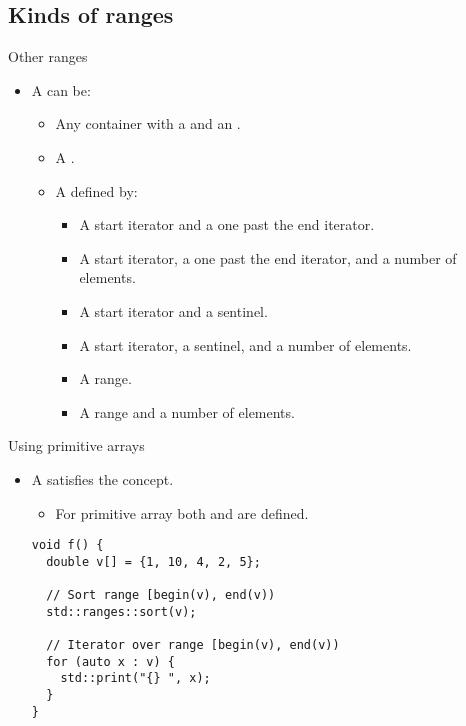 \subsection{Kinds of ranges}

\begin{frame}[t,fragile]{Other ranges}
\begin{itemize}
  \item A  can be:
    \begin{itemize}
      \item Any container with a  and an .
      \item A .
      \item A  defined by:
        \begin{itemize} 
          \item A start iterator and a one past the end iterator.
          \item A start iterator, a one past the end iterator, and a number of
                elements.
          \item A start iterator and a sentinel.
          \item A start iterator, a sentinel, and a number of elements.
          \item A range.
          \item A range and a number of elements.
        \end{itemize}
    \end{itemize}
\end{itemize}
\end{frame}

\begin{frame}[t,fragile]{Using primitive arrays}
\begin{itemize}
  \item A  satisfies the 
        concept.
    \begin{itemize}
      \item For primitive array  both 
             and 
            are defined.
    \end{itemize}

\begin{lstlisting}
void f() {
  double v[] = {1, 10, 4, 2, 5};

  // Sort range [begin(v), end(v))
  std::ranges::sort(v);

  // Iterator over range [begin(v), end(v))
  for (auto x : v) {
    std::print("{} ", x);
  }
}
\end{lstlisting}
\end{itemize}
\end{frame}

